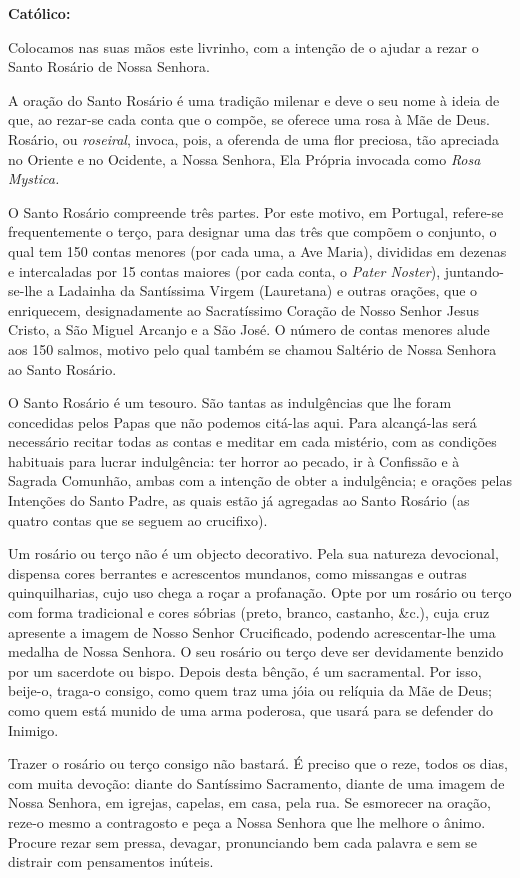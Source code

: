 \textbf{Católico:}

Colocamos nas suas mãos este livrinho, com a intenção de o ajudar a rezar o Santo Rosário de Nossa Senhora.

A oração do Santo Rosário é uma tradição milenar e deve o seu nome à ideia de que, ao rezar-se cada conta que o compõe, se oferece uma rosa à Mãe de Deus. Rosário, ou \textit{roseiral}, invoca, pois, a oferenda de uma flor preciosa, tão apreciada no Oriente e no Ocidente, a Nossa Senhora, Ela Própria invocada como \textit{Rosa Mystica.}

O Santo Rosário compreende três partes. Por este motivo, em Portugal, refere-se frequentemente o terço, para designar uma das três que compõem o conjunto, o qual tem 150 contas menores (por cada uma, a Ave Maria), divididas em dezenas e intercaladas por 15 contas maiores (por cada conta, o \textit{Pater Noster}), juntando-se-lhe a Ladainha da Santíssima Virgem (Lauretana) e outras orações, que o enriquecem, designadamente ao Sacratíssimo Coração de Nosso Senhor Jesus Cristo, a São Miguel Arcanjo e a São José. O número de contas menores alude aos 150 salmos, motivo pelo qual também se chamou Saltério de Nossa Senhora ao Santo Rosário.

O Santo Rosário é um tesouro. São tantas as indulgências que lhe foram concedidas pelos Papas que não podemos citá-las aqui. Para alcançá-las será necessário recitar todas as contas e meditar em cada mistério, com as condições habituais para lucrar indulgência: ter horror ao pecado, ir à Confissão e à Sagrada Comunhão, ambas com a intenção de obter a indulgência; e orações pelas Intenções do Santo Padre, as quais estão já agregadas ao Santo Rosário (as quatro contas que se seguem ao crucifixo).

Um rosário ou terço não é um objecto decorativo. Pela sua natureza devocional, dispensa cores berrantes e acrescentos mundanos, como missangas e outras quinquilharias, cujo uso chega a roçar a profanação. Opte por um rosário ou terço com forma tradicional e cores sóbrias (preto, branco, castanho, \&c.), cuja cruz apresente a imagem de Nosso Senhor Crucificado, podendo acrescentar-lhe uma medalha de Nossa Senhora. O seu rosário ou terço deve ser devidamente benzido por um sacerdote ou bispo. Depois desta bênção, é um sacramental. Por isso, beije-o, traga-o consigo, como quem traz uma jóia ou relíquia da Mãe de Deus; como quem está munido de uma arma poderosa, que usará para se defender do Inimigo.

Trazer o rosário ou terço consigo não bastará. É preciso que o reze, todos os dias, com muita devoção: diante do Santíssimo Sacramento, diante de uma imagem de Nossa Senhora, em igrejas, capelas, em casa, pela rua. Se esmorecer na oração, reze-o mesmo a contragosto e peça a Nossa Senhora que lhe melhore o ânimo. Procure rezar sem pressa, devagar, pronunciando bem cada palavra e sem se distrair com pensamentos inúteis.

